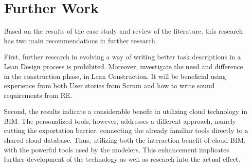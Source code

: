 \section{Further Work} \label{sec:further_research}
Based on the results of the case study and review of the literature, this research has two main recommendations in further research.

First, further research in evolving a way of writing better task descriptions in a Lean Design process is prohibited. Moreover, investigate the need and difference in the construction phase, in Lean Construction. It will be beneficial using experience from both User stories from Scrum and how to write sound requirements from RE.
	 
Second, the results indicate a considerable benefit in utilizing cloud technology in BIM. The personalized tools, however, addresses a different approach, namely cutting the exportation barrier, connecting the already familiar tools directly to a shared cloud database. Thus, utilizing both the interaction benefit of cloud BIM, with the powerful tools used by the modelers. This enhancement implicates further development of the technology as well as research into the actual effect.

\cleardoublepage